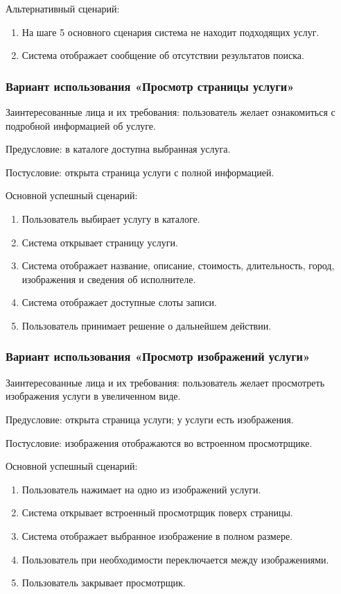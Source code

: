 Альтернативный сценарий:
\begin{enumerate}
	\item На шаге 5 основного сценария система не находит подходящих услуг.
	\item Система отображает сообщение об отсутствии результатов поиска.
\end{enumerate}

\subsubsection{Вариант использования «Просмотр страницы услуги»}

Заинтересованные лица и их требования: пользователь желает ознакомиться с подробной информацией об услуге.

Предусловие: в каталоге доступна выбранная услуга.

Постусловие: открыта страница услуги с полной информацией.

Основной успешный сценарий:
\begin{enumerate}
	\item Пользователь выбирает услугу в каталоге.
	\item Система открывает страницу услуги.
	\item Система отображает название, описание, стоимость, длительность, город, изображения и сведения об исполнителе.
	\item Система отображает доступные слоты записи.
	\item Пользователь принимает решение о дальнейшем действии.
\end{enumerate}

\subsubsection{Вариант использования «Просмотр изображений услуги»}

Заинтересованные лица и их требования: пользователь желает просмотреть изображения услуги в увеличенном виде.

Предусловие: открыта страница услуги; у услуги есть изображения.

Постусловие: изображения отображаются во встроенном просмотрщике.

Основной успешный сценарий:
\begin{enumerate}
	\item Пользователь нажимает на одно из изображений услуги.
	\item Система открывает встроенный просмотрщик поверх страницы.
	\item Система отображает выбранное изображение в полном размере.
	\item Пользователь при необходимости переключается между изображениями.
	\item Пользователь закрывает просмотрщик.
\end{enumerate}

